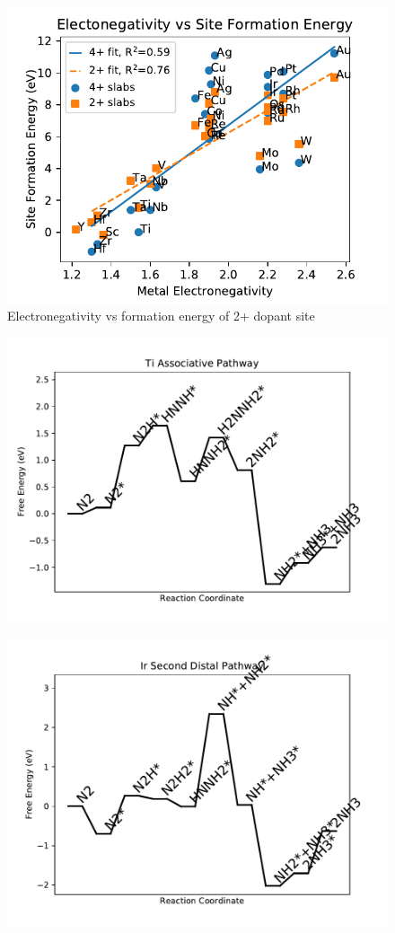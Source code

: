 \begin{figure}
\centering
\includegraphics[width=0.8\linewidth]{Images/electronegativity_vs_formation.pdf}
\caption{Electronegativity vs formation energy of 2+ dopant site}
\label{fig:electronegativity}
\end{figure}

\begin{figure}
\includegraphics[width=0.8\linewidth]{data/plots/Ti_associative.pdf}
\label{fig:Ti_associative}
\end{figure}

\begin{figure}
\includegraphics[width=0.8\linewidth]{data/plots/Ir_distal_2.pdf}
\label{fig:Ir_distal_2}
\end{figure}

